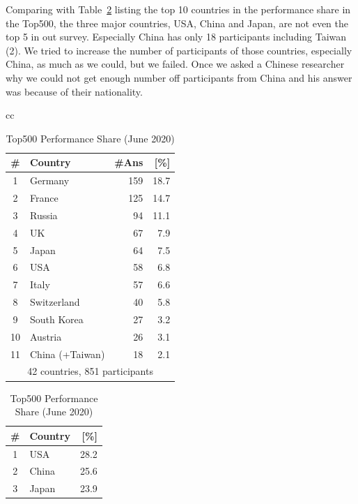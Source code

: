 \documentclass[conference,10pt,letterpaper]{IEEEtran}
\begin{document}
Comparing with Table~\ref{tab:top500-share} listing the top 10
countries in the performance share in the Top500\cite{Top500}, the
three major countries, USA, China and Japan, are not even the top 5 in
out survey. Especially China has only 18 participants including
Taiwan (2). We tried to increase the number of participants of those
countries, especially China, as much as we could, but we failed. Once
we asked a Chinese researcher why we could not get enough number off
participants from China and his answer was because of their nationality. 
%
\begin{table}[htb]%
\begin{center}%
\begin{tabular}[t]{cc}
%
\begin{minipage}[t]{0.5\hsize}
\begin{center}%
\caption{Top 11 Countries of Participants}%
\label{tab:countries}%
\begin{tabular}{c|l|r|r}%
\hline%
\# & Country & \#Ans & [\%] \\%
\hline%
1 & Germany 	& 159 & 18.7 \\%
2 & France 	& 125 & 14.7 \\%
3 & Russia 	& 94  & 11.1 \\%
4 & UK 		& 67  &  7.9 \\%
5 & Japan 	& 64  &  7.5 \\%
6 & USA 	& 58  &  6.8 \\%
7 & Italy 	& 57  &  6.6 \\%
\hline%
8 & Switzerland & 40  &  5.8 \\%
9 & South Korea & 27  &  3.2 \\%
10 & Austria 	& 26  &  3.1 \\%
11 & China (+Taiwan) & 18 & 2.1 \\%
\hline%
\multicolumn{4}{c}{42 countries, 851 participants} \\%
\end{tabular}%
\end{center}%
\end{minipage}
%
\begin{minipage}[t]{0.5\hsize}
\begin{center}%
\caption{Top500 Performance Share (June 2020)}%
\label{tab:top500-share}%
\begin{tabular}{c|l|r}%
\hline%
\# & Country & [\%] \\%
\hline%
1  & USA 	  & 28.2 \\%
2  & China 	  & 25.6 \\%
3  & Japan 	  & 23.9 \\%

\end{tabular}
\end{center}
\end{minipage}
\end{tabular}
\end{center}
\end{table}
\end{document}

